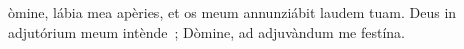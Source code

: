 òmine, lábia mea apèries, et os meum annunziábit laudem tuam. Deus in adjutórium meum intènde~; Dòmine, ad adjuvàndum me festína.

